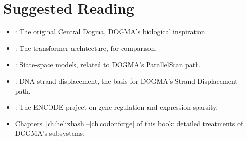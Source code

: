 \section*{Suggested Reading}
\begin{itemize}[leftmargin=1.5em]
  \item \citet{crick1970}: The original Central Dogma, DOGMA's biological inspiration.
  \item \citet{vaswani2017}: The transformer architecture, for comparison.
  \item \citet{gu2023mamba}: State-space models, related to DOGMA's ParallelScan path.
  \item \citet{zhang2011}: DNA strand displacement, the basis for DOGMA's Strand Displacement path.
  \item \citet{encode2012}: The ENCODE project on gene regulation and expression sparsity.
  \item Chapters~\ref{ch:helixhash}--\ref{ch:codonforge} of this book: detailed treatments of DOGMA's subsystems.
\end{itemize}
